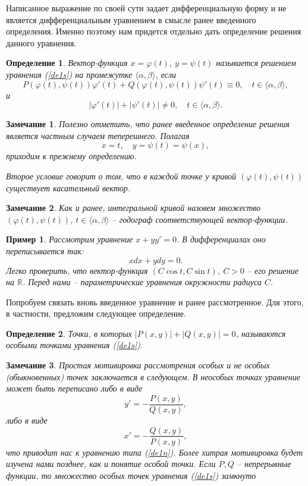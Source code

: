 \documentclass[a4paper,14pt]{extarticle}
\newtheorem{definition}{Определение}[subsection]
\newtheorem{example}{Пример}[subsection]
\newtheorem{remark}{Замечание}[subsection]
\begin{document}
Написанное выражение по своей сути задает дифференциальную форму и не является дифференциальным уравнением в смысле ранее введенного определения. Именно поэтому нам придется отдельно дать определение решения данного уравнения.
\begin{definition}
	Вектор-функция $x = \varphi(t)$, $y = \psi(t)$ называется решением уравнения (\ref{de1s}) на промежутке $\langle \alpha, \beta \rangle$, если
$$
P(\varphi(t), \psi(t))\varphi'(t) + Q(\varphi(t), \psi(t))\psi'(t) \equiv 0, \quad t \in \langle \alpha, \beta \rangle,
$$
и 
$$
|\varphi'(t)| + |\psi'(t)| \neq 0, \quad t \in \langle \alpha, \beta \rangle.
$$
\end{definition}
\begin{remark}
Полезно отметить, что ранее введенное определение решения является частным случаем теперешнего. Полагая 
$$
x = t, \quad y = \psi(t) = \psi(x),
$$
приходим к прежнему определению.

Второе условие говорит о том, что в каждой точке у кривой $(\varphi(t), \psi(t))$ существует касательный вектор.
\end{remark}
\begin{remark}
Как и ранее, интегральной кривой назовем множество $(\varphi(t), \psi(t))$, $t \in \langle \alpha, \beta \rangle$ -- годограф соответствующей вектор-функции.
\end{remark}
\begin{example}
Рассмотрим уравнение $x + yy' = 0$.	В дифференциалах оно переписывается так:
$$
xdx + ydy = 0.
$$
Легко проверить, что вектор-функция $(C\cos t, C \sin t)$, $C > 0$ -- его решение на $\mathbb R$. Перед нами -- параметрические уравнения окружности радиуса $C$.
\end{example}
Попробуем связать вновь введенное уравнение и ранее рассмотренное. Для этого, в частности, предложим следующее определение.
\begin{definition}
Точки, в которых $|P(x, y)| + |Q(x, y)| = 0$, называются особыми точками уравнения (\ref{de1s}).
\end{definition}
\begin{remark}
Простая мотивировка рассмотрения особых и не особых (обыкновенных) точек заключается в следующем. В неособых точках уравнение может быть переписано либо в виде
$$
y' = -\frac{P(x, y)}{Q(x, y)},
$$
либо в виде
$$
x' = -\frac{Q(x, y)}{P(x, y)},
$$
что приводит нас к уравнению типа (\ref{de1n}). Более хитрая мотивировка будет изучена нами позднее, как и понятие особой точки. Если $P, Q$ -- непрерывные функции, то множество особых точек уравнения (\ref{de1s}) замкнуто
\end{remark}
\end{document}
